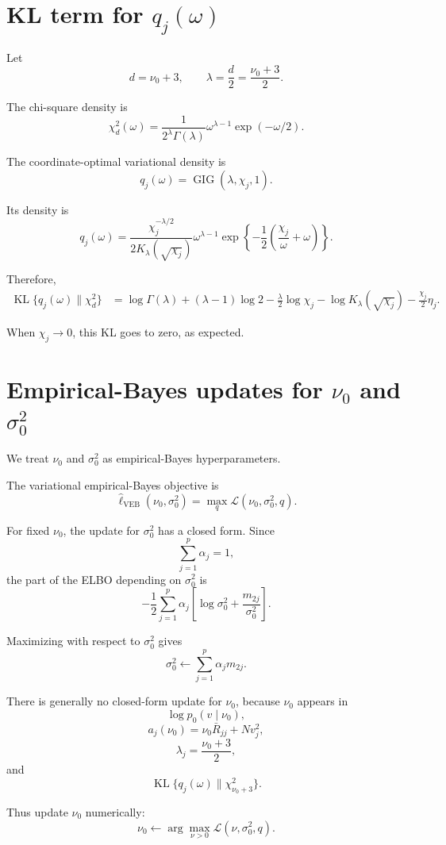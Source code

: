 \documentclass[11pt]{article}
\newcommand{\Rbar}{\bar R}
\newcommand{\nuo}{\nu_0}
\newcommand{\sigb}{\sigma_0^2}
\newcommand{\KL}{\operatorname{KL}}
\newcommand{\GIG}{\operatorname{GIG}}
\newcommand{\chisq}{\chi^2}
\begin{document}
\section{KL term for \(q_j(\omega)\)}

Let
\[
d=\nuo+3,
\qquad
\lambda=\frac d2=\frac{\nuo+3}{2}.
\]

The chi-square density is
\[
\chisq_d(\omega)
=
\frac{1}{2^\lambda\Gamma(\lambda)}
\omega^{\lambda-1}
\exp(-\omega/2).
\]

The coordinate-optimal variational density is
\[
q_j(\omega)
=
\GIG(\lambda,\chi_j,1).
\]

Its density is
\[
q_j(\omega)
=
\frac{
\chi_j^{-\lambda/2}
}{
2K_\lambda(\sqrt{\chi_j})
}
\omega^{\lambda-1}
\exp\left\{
-\frac12
\left(
\frac{\chi_j}{\omega}+\omega
\right)
\right\}.
\]

Therefore,
\begin{align}
\KL\{q_j(\omega)\|\chisq_d\}
&=
\log\Gamma(\lambda)
+
(\lambda-1)\log 2
-
\frac{\lambda}{2}\log\chi_j
-
\log K_\lambda(\sqrt{\chi_j})
-
\frac{\chi_j}{2}\eta_j.
\label{eq:KL_omega}
\end{align}

When \(\chi_j\to 0\), this KL goes to zero, as expected.

\section{Empirical-Bayes updates for \(\nuo\) and \(\sigb\)}

We treat \(\nuo\) and \(\sigb\) as empirical-Bayes hyperparameters.

The variational empirical-Bayes objective is
\[
\widehat\ell_{\mathrm{VEB}}(\nuo,\sigb)
=
\max_q \mathcal L(\nuo,\sigb,q).
\]

For fixed \(\nuo\), the update for \(\sigb\) has a closed form. Since
\[
\sum_{j=1}^p \alpha_j=1,
\]
the part of the ELBO depending on \(\sigb\) is
\[
-\frac12
\sum_{j=1}^p
\alpha_j
\left[
\log \sigb+\frac{m_{2j}}{\sigb}
\right].
\]

Maximizing with respect to \(\sigb\) gives
\[
\boxed{
\sigb
\leftarrow
\sum_{j=1}^p
\alpha_j m_{2j}.
}
\label{eq:sigma_update}
\]

There is generally no closed-form update for \(\nuo\), because \(\nuo\) appears in
\[
\log p_0(v\mid\nuo),
\]
\[
a_j(\nuo)=\nuo\Rbar_{jj}+Nv_j^2,
\]
\[
\lambda_j=\frac{\nuo+3}{2},
\]
and
\[
\KL\{q_j(\omega)\|\chisq_{\nuo+3}\}.
\]

Thus update \(\nuo\) numerically:
\[
\boxed{
\nuo
\leftarrow
\arg\max_{\nu>0}
\mathcal L(\nu,\sigb,q).
}
\]
\end{document}
